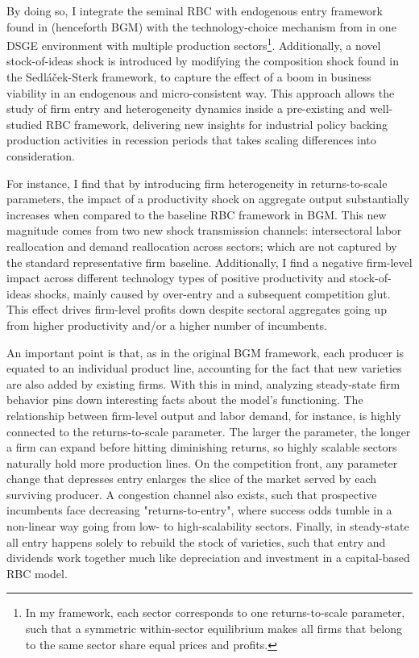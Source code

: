 \documentclass[a4paper,12pt]{article} %
\numberwithin{equation}{section} %
\numberwithin{figure}{section}
\numberwithin{table}{section}
\begin{document}
By doing so, I integrate the seminal RBC with endogenous entry framework found in \textcite{bilbiie2012endogenous} (henceforth BGM) with the technology-choice mechanism from
\textcite{sedlavcek2017growth} in one DSGE environment with multiple production sectors\footnote{In my framework, each sector corresponds to one 
returns-to-scale parameter, such that a symmetric within-sector equilibrium makes all firms that belong to the same sector share equal prices and profits.}. 
Additionally, a novel stock-of-ideas shock is introduced by modifying the composition shock found in the 
Sedláček-Sterk framework, to capture the effect of a boom in business viability in an endogenous and micro-consistent way. This approach allows the study of
firm entry and heterogeneity dynamics inside a pre-existing and well-studied RBC framework, delivering new insights for industrial policy backing 
production activities in recession periods that takes scaling differences into consideration.

For instance, I find that by introducing firm heterogeneity in returns-to-scale parameters, the impact of a productivity shock on aggregate output 
substantially increases when compared to the baseline RBC framework in BGM. This new magnitude comes from two new shock transmission channels: intersectoral 
labor reallocation and demand reallocation across sectors; which are not captured by the standard representative firm baseline. Additionally,
I find a negative firm-level impact across different technology types of positive productivity and stock-of-ideas shocks, mainly caused by over-entry
and a subsequent competition glut. This effect drives firm-level profits down despite sectoral aggregates going up from higher productivity and/or 
a higher number of incumbents.

An important point is that, as in the original BGM framework, each producer is equated to an individual product line, accounting for the fact that new varieties
are also added by existing firms. With this in mind, analyzing steady-state firm behavior pins down interesting facts about the model's functioning. 
The relationship between firm-level output and labor demand, for instance, is highly connected to the returns-to-scale parameter. The larger the 
parameter, the longer a firm can expand before hitting diminishing returns, so highly scalable sectors naturally hold more production lines. On the 
competition front, any parameter change that depresses entry enlarges the slice of the market served by each surviving producer. A congestion channel also
exists, such that prospective incumbents face decreasing "returns-to-entry", where success odds tumble in a non-linear way going from low- to high-scalability sectors.
Finally, in steady-state all entry happens solely to rebuild the stock of varieties, such that entry and dividends work together much like depreciation and
investment in a capital-based RBC model.
\end{document}

